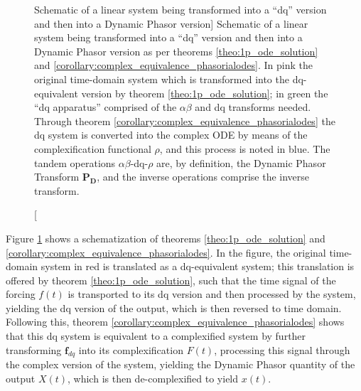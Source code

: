 \begin{figure}
\tikzexternalenable

\caption
[Schematic of a linear system being transformed into a ``dq'' version and then into a Dynamic Phasor version]
{Schematic of a linear system being transformed into a ``dq'' version and then into a Dynamic Phasor version as per theorems \ref{theo:1p_ode_solution} and \ref{corollary:complex_equivalence_phasorialodes}. In {\color{stewartpink} pink} the original time-domain system which is transformed into the dq-equivalent version by theorem \ref{theo:1p_ode_solution}; in {\color{stewartgreen} green} the ``dq apparatus'' comprised of the $\alpha\beta$ and dq transforms needed. Through theorem \ref{corollary:complex_equivalence_phasorialodes} the dq system is converted into the complex ODE by means of the complexification functional $\rho$, and this process is noted in {\color{stewartblue} blue.} The tandem operations $\alpha\beta$-dq-$\rho$ are, by definition, the Dynamic Phasor Transform $\mathbf{P_D}$, and the inverse operations comprise the inverse transform. }
\label{fig:dqification}
\end{figure}

	Figure \ref{fig:dqification} shows a schematization of theorems \ref{theo:1p_ode_solution} and \ref{corollary:complex_equivalence_phasorialodes}. In the figure, the original time-domain system in red is translated as a dq-equivalent system; this translation is offered by theorem \ref{theo:1p_ode_solution}, such that the time signal of the forcing $f(t)$ is transported to its dq version and then processed by the system, yielding the dq version of the output, which is then reversed to time domain. Following this, theorem \ref{corollary:complex_equivalence_phasorialodes} shows that this dq system is equivalent to a complexified system by further transforming $\mathbf{f}_{dq}$ into its complexification $F(t)$, processing this signal through the complex version of the system, yielding the Dynamic Phasor quantity of the output $X(t)$, which is then de-complexified to yield $x(t)$.

